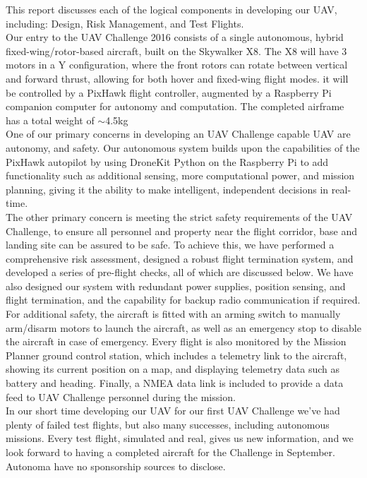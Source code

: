 \label{sec:intro}
This report discusses each of the logical components in developing our UAV, including: Design, Risk Management, and Test Flights.\\

Our entry to the UAV Challenge 2016 consists of a single autonomous, hybrid fixed-wing/rotor-based aircraft, built on the Skywalker X8. The X8 will have 3 motors in a Y configuration, where the front rotors can rotate between vertical and forward thrust, allowing for both hover and fixed-wing flight modes. it will be controlled by a PixHawk flight controller, augmented by a Raspberry Pi companion computer for autonomy and computation. The completed airframe has a total weight of $\sim$4.5kg\\

One of our primary concerns in developing an UAV Challenge capable UAV are autonomy, and safety. Our autonomous system builds upon the capabilities of the PixHawk autopilot by using DroneKit Python on the Raspberry Pi to add functionality such as additional sensing, more computational power, and mission planning, giving it the ability to make intelligent, independent decisions in real-time.\\

The other primary concern is meeting the strict safety requirements of the UAV Challenge, to ensure all personnel and property near the flight corridor, base and landing site can be assured to be safe. To achieve this, we have performed a comprehensive risk assessment, designed a robust flight termination system, and developed a series of pre-flight checks, all of which are discussed below. We have also designed our system with redundant power supplies, position sensing, and flight termination, and the capability for backup radio communication if required.\\

For additional safety, the aircraft is fitted with an arming switch to manually arm/disarm motors to launch the aircraft, as well as an emergency stop to disable the aircraft in case of emergency. Every flight is also monitored by the Mission Planner ground control station, which includes a telemetry link to the aircraft, showing its current position on a map, and displaying telemetry data such as battery and heading. Finally, a NMEA data link is included to provide a data feed to UAV Challenge personnel during the mission.\\

In our short time developing our UAV for our first UAV Challenge we've had plenty of failed test flights, but also many successes, including autonomous missions. Every test flight, simulated and real, gives us new information, and we look forward to having a completed aircraft for the Challenge in September.\\

Autonoma have no sponsorship sources to disclose.\\